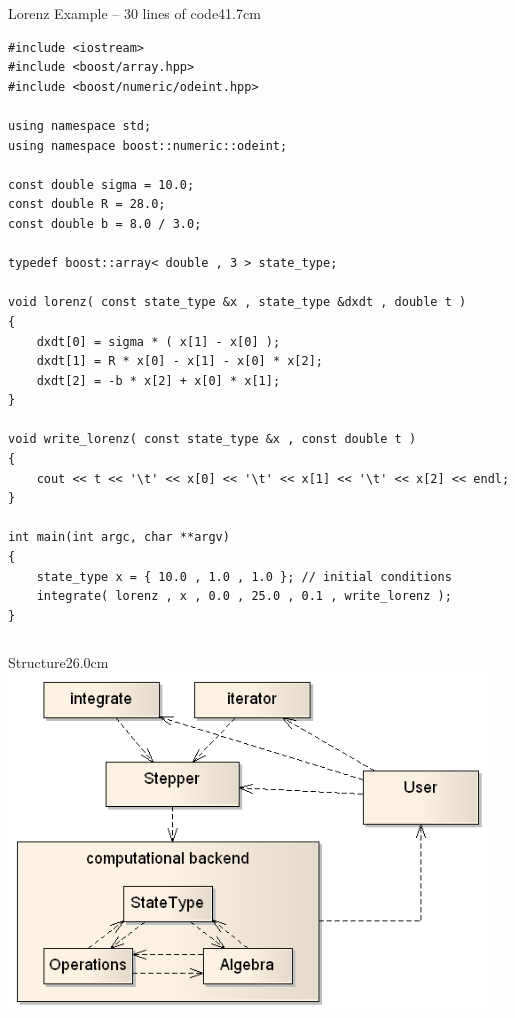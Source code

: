 \documentclass[final,hyperref={pdfpagelabels=false}]{beamer}
\begin{document}
\begin{frame}[fragile]{}
\begin{columns}[t]
\begin{column}{0.67\linewidth}
    \begin{blockwh}{Lorenz Example -- 30 lines of code}{41.7cm}
    \begin{lstlisting}
#include <iostream>
#include <boost/array.hpp>
#include <boost/numeric/odeint.hpp>

using namespace std;
using namespace boost::numeric::odeint;

const double sigma = 10.0;
const double R = 28.0;
const double b = 8.0 / 3.0;

typedef boost::array< double , 3 > state_type;

void lorenz( const state_type &x , state_type &dxdt , double t )
{
    dxdt[0] = sigma * ( x[1] - x[0] );
    dxdt[1] = R * x[0] - x[1] - x[0] * x[2];
    dxdt[2] = -b * x[2] + x[0] * x[1];
}

void write_lorenz( const state_type &x , const double t )
{
    cout << t << '\t' << x[0] << '\t' << x[1] << '\t' << x[2] << endl;
}

int main(int argc, char **argv)
{
    state_type x = { 10.0 , 1.0 , 1.0 }; // initial conditions
    integrate( lorenz , x , 0.0 , 25.0 , 0.1 , write_lorenz );
}
    \end{lstlisting}
    \end{blockwh}
  \end{column}

\end{columns}

\vspace{0.5cm}

\begin{columns}[t]
  \begin{column}{0.495\linewidth}
    \begin{blockwh}{Structure}{26.0cm}
      \centering
      \includegraphics[width=0.95\textwidth]{odeint_modularization.png}
    \end{blockwh}
  \end{column}


\end{columns}
\end{frame}
\end{document}

